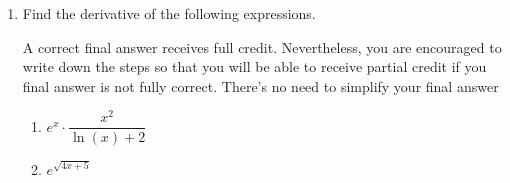 \documentclass[11pt]{article}
\begin{document}
\begin{enumerate}
If you need to write down your work, please do so at the bottom half of this page, not in the answer space.

\begin{center}
        \begin{tabular}{l c l l c l}
            $\displaystyle\frac{d}{dx}\left[ 10x^7 \right]$ &$=$ &  {\color{blue} $70 x^6$} &
            $\displaystyle\frac{d}{dx}\left[ 3^x-\dfrac{5}{x^4} \right]$ & $=$ & {\color{blue} $3^x \ln 3 + 20 x^{-5}$}\\[0.3in]
            $\displaystyle\frac{d}{dx}\left[ \left(\dfrac{2}{5}\right)^9 \right]$ & $=$ &  {\color{blue} $0$} & 
            $\displaystyle\frac{d}{dx}\left[ \sqrt[3]{x^4}-e^x+4\ln(x)\right]$ & $=$ &  {\color{blue} $\frac{4}{3} x^{1/3} - e^x + 4 x^{-1}$}\\[0.3in]
            $\displaystyle\frac{d}{dx}\left[ 3\log_5(x) \right]$ & $=$ &  {\color{blue} $\frac{3}{x \ln5 }$}&
            $\displaystyle\frac{d}{dx}\left[ \dfrac{-7x^4+3x^3-2x}{x^2} \right]$ & $=$ &  {\color{blue} $-14x+3+2x^{-2}$}\\[0.3in]
        \end{tabular} 
\end{center}


\newpage


\item Find the derivative of the following expressions. 

A correct final answer receives full credit. Nevertheless, you are encouraged to write down the steps so that you will be able to receive partial credit if you final answer is not fully correct. There's no need to simplify your final answer

\begin{enumerate}
\item $e^x\cdot\dfrac{x^2}{\ln(x)+2}$

\vfill

\item $e^{\sqrt{4x+5}}$

\vfill 
\end{enumerate}


\end{enumerate}
\end{document}
